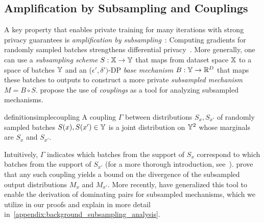 \subsection{Amplification by Subsampling and Couplings}
A key property that enables private training for many iterations with strong privacy guarantees is \emph{amplification by subsampling}~\cite{kasiviswanathan2011can}: Computing gradients for randomly sampled batches strengthens differential privacy~\cite{abadi2016deep}.
More generally, one can use a \emph{subsampling scheme} $S : {\mathbb{X}} \rightarrow {\mathbb{Y}}$ that maps from dataset space ${\mathbb{X}}$ to a space of batches ${\mathbb{Y}}$ and an ($\epsilon',\delta')$-DP \emph{base mechanism} $B : {\mathbb{Y}} \rightarrow {\mathbb{R}}^D$ that maps these batches to outputs
to construct a more private \emph{subsampled mechanism} $M = B \circ S$.
\citet{balle2018privacy} propose the use of \emph{couplings} as a tool for analyzing subsampled mechanisms.
\begin{restatable}{definition}{simplecoupling}
    A coupling $\Gamma$ between distributions $S_x, S_{x'}$ of randomly sampled batches $S(x), S(x') \in {\mathbb{Y}}$ is a joint distribution on ${\mathbb{Y}}^2$ whose marginals are $S_x$ and $S_{x'}$.
\end{restatable}
Intuitively, $\Gamma$  indicates which batches from the support of $S_x$ correspond to which batches from the support of $S_{x'}$ (for a more thorough introduction, see~\cite{Villani2009}).
\citet{balle2018privacy} prove that any such coupling yields a bound on the divergence of the subsampled output distributions $M_x$ and $M_{x'}$.
More recently, \citet{schuchardt2024unified} have generalized this tool to enable the derivation of dominating pairs for subsampled mechanisms, which we utilize in our proofs and explain in more detail in~\cref{appendix:background_subsampling_analysis}.

